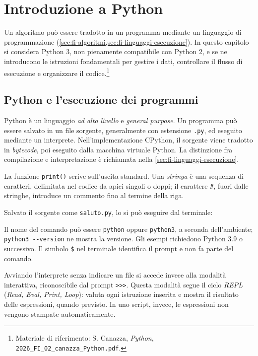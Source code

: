 \chapter{Introduzione a Python}
\label{chap:introduzione-python}

Un algoritmo può essere tradotto in un programma mediante un linguaggio di
programmazione (\cref{sec:fi-algoritmi,sec:fi-linguaggi-esecuzione}). In questo
capitolo si considera Python 3, non pienamente compatibile con Python 2,
e se ne introducono le istruzioni fondamentali per gestire i dati,
controllare il flusso di esecuzione e organizzare il codice.\footnote{Materiale
di riferimento: S. Canazza, \emph{Python},
\nolinkurl{2026_FI_02_canazza_Python.pdf}.}

\section{Python e l'esecuzione dei programmi}
\label{sec:fi-python-esecuzione}

Python è un linguaggio \emph{ad alto livello} e \emph{general purpose}. Un
programma può essere salvato in un file sorgente, generalmente con estensione
\texttt{.py}, ed eseguito mediante un interprete. Nell'implementazione
CPython, il sorgente viene tradotto in \emph{bytecode}, poi eseguito
dalla macchina virtuale Python. La distinzione fra compilazione e
interpretazione è richiamata nella \cref{sec:fi-linguaggi-esecuzione}.

La funzione \texttt{print()} scrive sull'uscita standard. Una \emph{stringa}
è una sequenza di caratteri, delimitata nel codice da apici singoli o doppi;
il carattere \texttt{\#}, fuori dalle stringhe, introduce un commento fino
al termine della riga.



Salvato il sorgente come \texttt{saluto.py}, lo si può eseguire dal
terminale:



Il nome del comando può essere \texttt{python} oppure
\texttt{python3}, a seconda dell'ambiente;
\verb|python3 --version| ne mostra la versione.
Gli esempi richiedono Python 3.9 o successivo.
Il simbolo \texttt{\$} nel terminale identifica il prompt e non fa parte
del comando.

Avviando l'interprete senza indicare un file si accede invece alla modalità
interattiva, riconoscibile dal prompt \lstinline|>>>|. Questa modalità
segue il ciclo \emph{REPL} (\emph{Read, Eval, Print, Loop}): valuta ogni
istruzione inserita e mostra il risultato delle espressioni, quando
previsto. In uno script, invece, le espressioni non vengono stampate
automaticamente.

